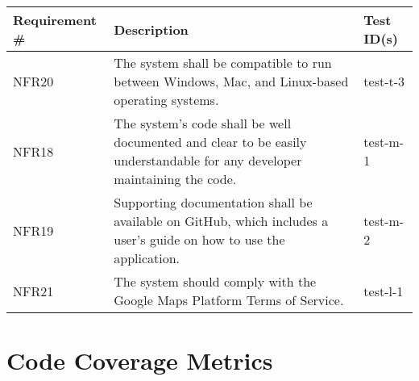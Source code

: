 \documentclass[12pt, titlepage]{article}
\begin{document}
  \newpage	
  
\begin{table}[!hbp]
	
	\begin{tabular}{|p{3.5cm}|p{6.5cm}|p{4.5cm}|}

	\hline
	\textbf{Requirement \#} & \textbf{Description}                                                                                                                                                                  & \textbf{Test ID(s)}                                                                                          \\ \hline	
	NFR20                     & The system shall be compatible to run between Windows, Mac, and Linux-based operating systems.                                                                                                       & test-t-3                                                                                          \\ \hline
	NFR18                    & The system's code shall be well documented and clear to be easily understandable for any developer maintaining the code.                                                                                                        & test-m-1                                                                                          \\ \hline
	NFR19                    & Supporting documentation shall be available on GitHub, which includes a user's guide on how to use the application.                                                                                                        & test-m-2                                                                                          \\ \hline
	NFR21                     & The system should comply with the Google Maps Platform Terms of Service.                                                                                                        & test-l-1                                                                                          \\ \hline
		\end{tabular}
  \end{table}

\newpage

\section{Code Coverage Metrics}
\end{document}
